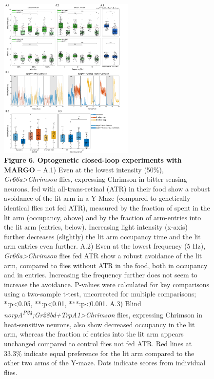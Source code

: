 \documentclass[10pt]{article}
\begin{document}
\newpage
\begin{figure}[t!]
	\begin{center}
		\includegraphics[width=0.6\textwidth]{../figures/optogenetics_fig.pdf}
	\end{center}
	\caption*{\footnotesize \textbf{Figure 6. Optogenetic closed-loop experiments with MARGO} -- A.1) Even at the lowest intensity (50\%), \textit{Gr66a>Chrimson} flies, expressing Chrimson in bitter-sensing neurons, fed with all-trans-retinal (ATR) in their food show a robust avoidance of the lit arm in a Y-Maze (compared to genetically identical flies not fed ATR), measured by the fraction of spent in the lit arm (occupancy, above) and by the fraction of arm-entries into the lit arm (entries, below). Increasing light intensity (x-axis) further decreases (slightly) the lit arm occupancy time and the lit arm entries even further.
	A.2) Even at the lowest frequency (5 Hz), \textit{Gr66a>Chrimson} flies fed ATR show a robust avoidance of the lit arm, compared to flies without ATR in the food, both in occupancy and in entries. Increasing the frequency further does not seem to increase the avoidance. P-values were calculated for key comparisons using a two-sample t-test, uncorrected for multiple comparisons; *:p<0.05, **:p<0.01, ***:p<0.001. 
	A.3) Blind \textit{norpA\textsuperscript{P24};Gr28bd+TrpA1>Chrimson} flies, expressing Chrimson in heat-sensitive neurons, also show decreased occupancy in the lit arm, whereas the fraction of entries into the lit arm appears unchanged compared to control flies not fed ATR. 
	Red lines at 33.3\% indicate equal preference for the lit arm compared to the other two arms of the Y-maze. Dots indicate scores from individual flies. 
}
\end{figure}
\end{document}
